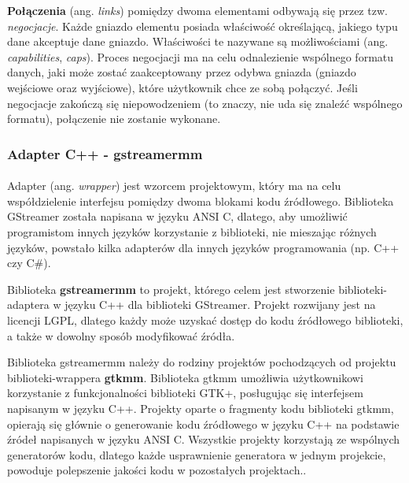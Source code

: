 \documentclass[12pt]{article}
\begin{document}
\textbf{Połączenia} (ang. \textit{links}) pomiędzy dwoma elementami odbywają się przez tzw. \textit{negocjacje}. Każde gniazdo elementu posiada właściwość określającą, jakiego typu dane akceptuje dane gniazdo. Właściwości te nazywane są możliwościami (ang. \textit{capabilities}, \textit{caps}). Proces negocjacji ma na celu odnalezienie wspólnego formatu danych, jaki może zostać zaakceptowany przez odybwa gniazda (gniazdo wejściowe oraz wyjściowe), które użytkownik chce ze sobą połączyć. Jeśli negocjacje zakończą się niepowodzeniem (to znaczy, nie uda się znaleźć wspólnego formatu), połączenie nie zostanie wykonane.

\subsubsection{Adapter C++ - gstreamermm}
\paragraph{}
Adapter (ang. \textit{wrapper}) jest wzorcem projektowym, który ma na celu współdzielenie interfejsu pomiędzy dwoma blokami kodu źródłowego. Biblioteka GStreamer została napisana w języku ANSI C, dlatego, aby umożliwić programistom innych języków korzystanie z biblioteki, nie mieszając różnych języków, powstało kilka adapterów dla innych języków programowania (np. C++ czy C\#).

Biblioteka \textbf{gstreamermm} to projekt, którego celem jest stworzenie biblioteki-adaptera w języku C++ dla biblioteki GStreamer. Projekt rozwijany jest na licencji LGPL, dlatego każdy może uzyskać dostęp do kodu źródłowego biblioteki, a także w dowolny sposób modyfikować źródła.

Biblioteka gstreamermm należy do rodziny projektów pochodzących od projektu biblioteki-wrappera \textbf{gtkmm}. Biblioteka gtkmm umożliwia użytkownikowi korzystanie z funkcjonalności biblioteki GTK+, posługując się interfejsem napisanym w języku C++. Projekty oparte o fragmenty kodu biblioteki gtkmm, opierają się głównie o generowanie kodu źródłowego w języku C++ na podstawie źródeł napisanych w języku ANSI C. Wszystkie projekty korzystają ze wspólnych generatorów kodu, dlatego każde usprawnienie generatora w jednym projekcie, powoduje polepszenie jakości kodu w pozostałych projektach..
\end{document}
